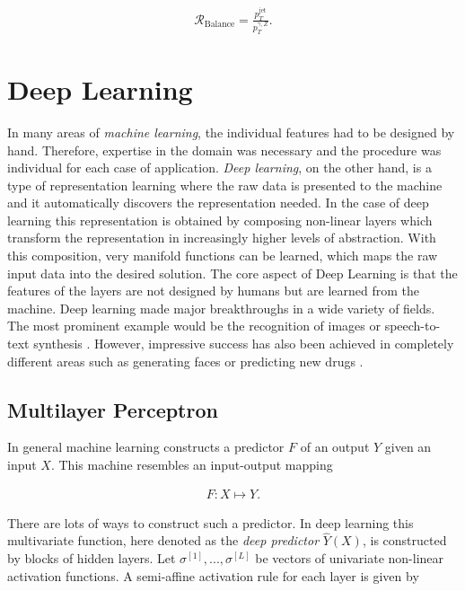 \documentclass[12pt, a4paper]{thesis}
\begin{document}
\begin{align}
\mathcal{R}_{\text{Balance}}=\frac{p_T^{\text{jet}}}{p_T^{\gamma,Z}}.
\end{align}

\chapter{Deep Learning}
\label{sec:org1ca4c32}

In many areas of \emph{machine learning}, the individual features had to be designed by
hand. Therefore, expertise in the domain was necessary and the procedure was
individual for each case of application.  \emph{Deep learning}, on the other hand, is a
type of representation learning where the raw data is presented to the machine
and it automatically discovers the representation needed. In the case of deep
learning this representation is obtained by composing non-linear layers which
transform the representation in increasingly higher levels of abstraction.  With
this composition, very manifold functions can be learned, which maps the
raw input data into the desired solution. The core aspect of Deep Learning is
that the features of the layers are not designed by humans but are learned from
the machine.
Deep learning made major breakthroughs in a wide variety of fields. The most
prominent example would be the recognition of images
\cite{szegedy15,NIPS2014_5573,farabet13,krizhevsky17} or speech-to-text synthesis
\cite{mikolov11_strat,hinton-speech,sainath13_deep} . However, impressive success
has also been achieved in completely different areas such as generating faces
\cite{karras17_progr_growin_gans_improv_qualit_stabil_variat} or predicting new
drugs \cite{ma15_deep_neural_nets_as_method}.

\section{Multilayer Perceptron}
\label{sec:org1b5c208}

In general machine learning constructs a predictor \(F\) of an output \(Y\) given an
input \(X\). This machine resembles an input-output mapping

\begin{align}
 F : X \mapsto Y.
\end{align}

There are lots of ways to construct such a predictor. In deep learning this
multivariate function, here denoted as the \emph{deep predictor} \(\hat{Y}(X)\), is
constructed by blocks of hidden layers. Let \(\sigma^{[1]},...,\sigma^{[L]}\) be vectors of
univariate non-linear activation functions. A semi-affine activation rule for
each layer is given by
\end{document}
